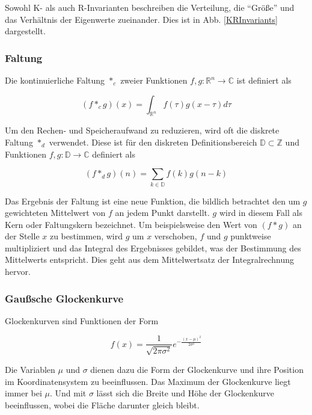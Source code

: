 \documentclass[a4paper,fontsize=12pt,toc=bib,halfparskip]{scrartcl}
\begin{document}
Sowohl K- als auch R-Invarianten beschreiben die Verteilung, die ``Gr\"o{\ss}e'' und das Verh\"altnis der Eigenwerte zueinander. Dies ist in Abb. \ref{KRInvariants} dargestellt. 

\subsubsection{Faltung}
Die kontinuierliche Faltung $*_c$ zweier Funktionen $f,g:\mathbb{R}^n\rightarrow\mathbb{C}$ ist definiert als

\begin{equation}
(f*_cg)(x) = \int_{\mathbb{R}^n} f(\tau)g(x-\tau)d\tau
\end{equation}

Um den Rechen- und Speicheraufwand zu reduzieren, wird oft die diskrete Faltung $*_d$ verwendet. Diese ist f\"ur den diskreten Definitionsbereich $\mathbb{D} \subset \mathbb{Z}$ und Funktionen $f,g:\mathbb{D}\rightarrow\mathbb{C}$ definiert als

\begin{equation}
(f*_dg)(n) = \sum_{k\in\mathbb{D}}f(k)g(n-k)
\end{equation}

Das Ergebnis der Faltung ist eine neue Funktion, die bildlich betrachtet den um $g$ gewichteten Mittelwert von $f$ an jedem Punkt darstellt. $g$ wird in diesem Fall als Kern oder Faltungskern bezeichnet. Um beispielsweise den Wert von $(f*g)$ an der Stelle $x$ zu bestimmen, wird $g$ um $x$ verschoben, $f$ und $g$ punktweise multipliziert und das Integral des Ergebnisses gebildet, was der Bestimmung des Mittelwerts entspricht. Dies geht aus dem Mittelwertsatz der Integralrechnung hervor.

\subsubsection{Gau{\ss}sche Glockenkurve}
Glockenkurven sind Funktionen der Form 

\begin{equation}
f(x) = \frac{1}{\sqrt{2\pi \sigma^2}}e^{-\frac{(x-\mu)^2}{2\sigma^2}}
\end{equation}

Die Variablen $\mu$ und $\sigma$ dienen dazu die Form der Glockenkurve und ihre Position im Koordinatensystem zu beeinflussen. Das Maximum der Glockenkurve liegt immer bei $\mu$. Und mit $\sigma$ l\"asst sich die Breite und H\"ohe der Glockenkurve beeinflussen, wobei die Fl\"ache darunter gleich bleibt.
\end{document}
